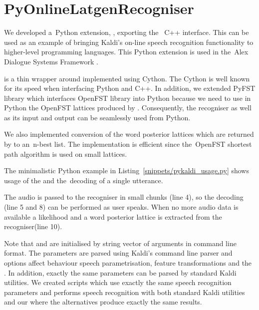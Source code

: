 \section{PyOnlineLatgenRecogniser}
\label{sec:pyext}

We developed a~Python extension, , exporting the~ C++ interface.
This can be used as an example of bringing Kaldi's on-line speech recognition functionality to higher-level programming languages.
This Python extension is used in the~Alex Dialogue Systems Framework \cite{asdf2014url}.

 is a thin wrapper around  implemented using Cython\cite{cython2014url}.
The Cython is well known for its speed when interfacing Python and C++.
In addition, we extended PyFST library\cite{pyfst2014url} which interfaces OpenFST library into Python because we need to use in Python the OpenFST lattices produced by .
Consequently, the recogniser as well as its input and output can be seamlessly used from Python.

We also implemented conversion of the word posterior lattices which are returned by  to an~n-best list. 
The implementation is efficient since the~OpenFST shortest path algorithm is used on small lattices.

The minimalistic Python example in Listing~\ref{snippets/pykaldi_usage.py} shows usage of the  and the~decoding of a single utterance.

The audio is passed to the recogniser in small chunks (line 4), so the decoding (line 5 and 8) can be performed as user speaks.
When no more audio data is available a likelihood and a word posterior lattice is extracted from the recogniser(line 10).

Note that  and  are initialised by string vector of arguments in command line format.
The parameters are parsed using Kaldi's command line parser and options affect behaviour speech parametrisation, feature transformations and  the .
In addition, exactly the same parameters can be parsed by standard Kaldi utilities. We created scripts which use exactly the same speech recognition parameters and performs speech recognition with both standard Kaldi utilities and our  where the alternatives produce exactly the same results.

